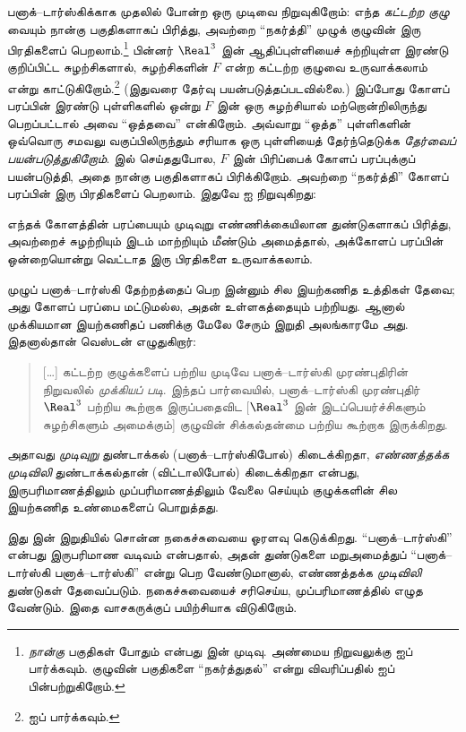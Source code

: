 \documentclass[../../../include/open-logic-section]{subfiles}
\begin{document}
பனாக்--டார்ஸ்கிக்காக முதலில் 
போன்ற ஒரு முடிவை நிறுவுகிறோம்: எந்த
\emph{கட்டற்ற குழு} வையும் நான்கு பகுதிகளாகப் பிரித்து,
அவற்றை ``நகர்த்தி'' முழுக் குழுவின் இரு பிரதிகளைப்
பெறலாம்.\footnote{\emph{நான்கு} பகுதிகள் போதும்
என்பது \cite{Robinson1947} இன் முடிவு. அண்மைய
நிறுவலுக்கு \citet[Theorem 5.2]{Wagon2016} ஐப் பார்க்கவும்.
குழுவின் பகுதிகளை ``நகர்த்துதல்'' என்று விவரிப்பதில்
\citet[p.~3]{Weston2003} ஐப் பின்பற்றுகிறோம்.}
பின்னர் $\Real^3$ இன் ஆதிப்புள்ளியைச் சுற்றியுள்ள
இரண்டு குறிப்பிட்ட சுழற்சிகளால், சுழற்சிகளின்
$F$ என்ற கட்டற்ற குழுவை உருவாக்கலாம் என்று
காட்டுகிறோம்.\footnote{\citet[Theorem 2.1]{Wagon2016}
ஐப் பார்க்கவும்.} (இதுவரை தேர்வு பயன்படுத்தப்படவில்லை.)
இப்போது கோளப் பரப்பின் இரண்டு புள்ளிகளில் ஒன்று
$F$ இன் ஒரு சுழற்சியால் மற்றொன்றிலிருந்து பெறப்பட்டால்
அவை ``ஒத்தவை'' என்கிறோம். அவ்வாறு ``ஒத்த''
புள்ளிகளின் ஒவ்வொரு சமவலு வகுப்பிலிருந்தும் சரியாக
ஒரு புள்ளியைத் தேர்ந்தெடுக்க \emph{தேர்வைப் பயன்படுத்துகிறோம்}.
 இல் செய்ததுபோல,
$F$ இன் பிரிப்பைக் கோளப் பரப்புக்குப் பயன்படுத்தி,
அதை நான்கு பகுதிகளாகப் பிரிக்கிறோம். அவற்றை
``நகர்த்தி'' கோளப் பரப்பின் இரு பிரதிகளைப் பெறலாம்.
இதுவே \citep{Hausdorff1914} ஐ நிறுவுகிறது:

\begin{thm}[ஹவுஸ்டார்ஃப் முரண்புதிர் ($\ZFC$ இல்)]
எந்தக் கோளத்தின் பரப்பையும் முடிவுறு எண்ணிக்கையிலான
துண்டுகளாகப் பிரித்து, அவற்றைச் சுழற்றியும் இடம்
மாற்றியும் மீண்டும் அமைத்தால், அக்கோளப் பரப்பின்
ஒன்றையொன்று வெட்டாத இரு பிரதிகளை உருவாக்கலாம்.
\end{thm}

முழுப் பனாக்--டார்ஸ்கி தேற்றத்தைப் பெற இன்னும் சில
இயற்கணித உத்திகள் தேவை; அது கோளப் பரப்பை மட்டுமல்ல,
அதன் உள்ளகத்தையும் பற்றியது. ஆனால் முக்கியமான
இயற்கணிதப் பணிக்கு மேலே சேரும் இறுதி அலங்காரமே அது.
இதனால்தான் வெஸ்டன் எழுதுகிறார்:
\begin{quote}
  [\ldots] கட்டற்ற குழுக்களைப் பற்றிய முடிவே
  பனாக்--டார்ஸ்கி முரண்புதிரின் நிறுவலில்
  \emph{முக்கியப் படி}. இந்தப் பார்வையில்,
  பனாக்--டார்ஸ்கி முரண்புதிர் $\Real^3$ பற்றிய
  கூற்றாக இருப்பதைவிட [$\Real^3$ இன் இடப்பெயர்ச்சிகளும்
  சுழற்சிகளும் அமைக்கும்] குழுவின் சிக்கல்தன்மை பற்றிய
  கூற்றாக இருக்கிறது. \cite[p.~16]{Weston2003}
\end{quote}
அதாவது \emph{முடிவுறு} துண்டாக்கல்
(பனாக்--டார்ஸ்கிபோல்) கிடைக்கிறதா, \emph{எண்ணத்தக்க
முடிவிலி} துண்டாக்கல்தான் (விட்டாலிபோல்) கிடைக்கிறதா
என்பது, இருபரிமாணத்திலும் முப்பரிமாணத்திலும் வேலை
செய்யும் குழுக்களின் சில இயற்கணித உண்மைகளைப் பொறுத்தது.

இது  இன் இறுதியில் சொன்ன
நகைச்சுவையை ஓரளவு கெடுக்கிறது. ``பனாக்--டார்ஸ்கி''
என்பது இருபரிமாண வடிவம் என்பதால், அதன் துண்டுகளை
மறுஅமைத்துப் ``பனாக்--டார்ஸ்கி பனாக்--டார்ஸ்கி''
என்று பெற வேண்டுமானால், எண்ணத்தக்க
\emph{முடிவிலி} துண்டுகள் தேவைப்படும். நகைச்சுவையைச்
சரிசெய்ய, முப்பரிமாணத்தில் எழுத வேண்டும். இதை
வாசகருக்குப் பயிற்சியாக விடுகிறோம்.
\end{document}
